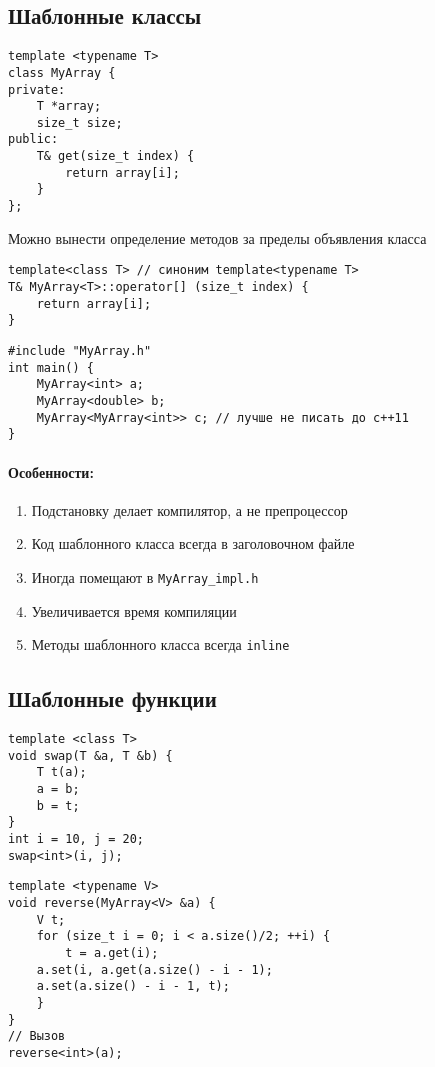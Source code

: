 \subsection{Шаблонные классы}
\begin{verbatim}
template <typename T>
class MyArray {
private:
    T *array;
    size_t size;
public:
    T& get(size_t index) {
        return array[i];
    }
};
\end{verbatim}
Можно вынести определение методов за пределы объявления класса
\begin{verbatim}
template<class T> // синоним template<typename T>
T& MyArray<T>::operator[] (size_t index) {
    return array[i];
}
\end{verbatim}
\begin{verbatim}
#include "MyArray.h"
int main() {
    MyArray<int> a;
    MyArray<double> b;
    MyArray<MyArray<int>> c; // лучше не писать до c++11
}
\end{verbatim}
\paragraph{Особенности:}
\begin{enumerate}[noitemsep]
    \item Подстановку делает компилятор, а не препроцессор
    \item Код шаблонного класса всегда в заголовочном файле
    \item Иногда помещают в \texttt{MyArray\_impl.h} 
    \item Увеличивается время компиляции
    \item Методы шаблонного класса всегда \texttt{inline}
\end{enumerate} 
\subsection{Шаблонные функции}
\begin{verbatim}
template <class T>
void swap(T &a, T &b) {
    T t(a);
    a = b;
    b = t;
}
int i = 10, j = 20;
swap<int>(i, j);
\end{verbatim}
\begin{verbatim}
template <typename V>
void reverse(MyArray<V> &a) {
    V t;
    for (size_t i = 0; i < a.size()/2; ++i) {
        t = a.get(i);
	a.set(i, a.get(a.size() - i - 1);
	a.set(a.size() - i - 1, t);
    }
}
// Вызов
reverse<int>(a);
\end{verbatim}
